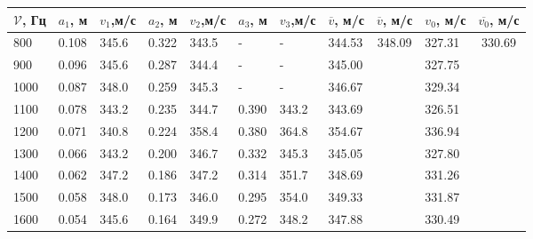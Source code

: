 \documentclass[12pt]{article}
\begin{document}
\begin{center}
    \begin{tabular}{|l|l|l|l|l|l|l|l|c|l|c|}
        \hline
        $\mathcal{V}$, Гц & $a_1$, м & $v_1$,м/с & $a_2$, м & $v_2$,м/с & $a_3$, м & $v_3$,м/с & $\overline{v}$, м/с & $\overline{v}$, м/с  & $v_0$, м/с & \multicolumn{1}{l|}{$\overline{v_0}$, м/с} \\ \hline
        800             & 0.108  & 345.6     & 0.322  & 343.5    & -      & -        & 344.53            & \multirow{13}{*}{348.09} & 327.31          & \multirow{13}{*}{330.69}                        \\ \cline{1-8} \cline{10-10}
        900             & 0.096  & 345.6     & 0.287  & 344.4    & -      & -        & 345.00            &                          & 327.75          &                                                 \\ \cline{1-8} \cline{10-10}
        1000            & 0.087  & 348.0     & 0.259  & 345.3    & -      & -        & 346.67            &                          & 329.34          &                                                 \\ \cline{1-8} \cline{10-10}
        1100            & 0.078  & 343.2     & 0.235  & 344.7    & 0.390  & 343.2    & 343.69            &                          & 326.51          &                                                 \\ \cline{1-8} \cline{10-10}
        1200            & 0.071  & 340.8     & 0.224  & 358.4    & 0.380  & 364.8    & 354.67            &                          & 336.94          &                                                 \\ \cline{1-8} \cline{10-10}
        1300            & 0.066  & 343.2     & 0.200  & 346.7    & 0.332  & 345.3    & 345.05            &                          & 327.80          &                                                 \\ \cline{1-8} \cline{10-10}
        1400            & 0.062  & 347.2     & 0.186  & 347.2    & 0.314  & 351.7    & 348.69            &                          & 331.26          &                                                 \\ \cline{1-8} \cline{10-10}
        1500            & 0.058  & 348.0     & 0.173  & 346.0    & 0.295  & 354.0    & 349.33            &                          & 331.87          &                                                 \\ \cline{1-8} \cline{10-10}
        1600            & 0.054  & 345.6     & 0.164  & 349.9    & 0.272  & 348.2    & 347.88            &                          & 330.49          &                                                 \\ \cline{1-8} \cline{10-10}

\end{tabular}
\end{center}
\end{document}
